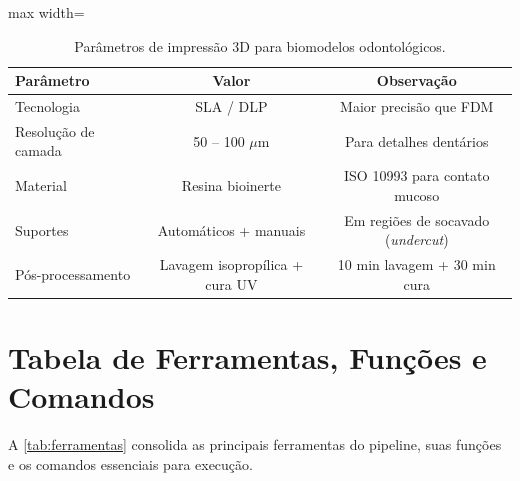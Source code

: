 \begin{table}[htb]
\centering
\caption{Parâmetros de impressão 3D para biomodelos odontológicos.}
\label{tab:impressao3d}
\begin{adjustbox}{max width=\textwidth}
\begin{tabular}{lcc}
\toprule
\textbf{Parâmetro} & \textbf{Valor} & \textbf{Observação} \\
\midrule
Tecnologia & SLA / DLP & Maior precisão que FDM \\
Resolução de camada & 50 -- 100 $\mu$m & Para detalhes dentários \\
Material & Resina bioinerte & ISO 10993 para contato mucoso \\
Suportes & Automáticos + manuais & Em regiões de socavado (\textit{undercut}) \\
Pós-processamento & Lavagem isopropílica + cura UV & 10 min lavagem + 30 min cura \\
\bottomrule
\end{tabular}
\end{adjustbox}
\end{table}

\section{Tabela de Ferramentas, Funções e Comandos}
\label{sec:ferramentas}

A \autoref{tab:ferramentas} consolida as principais ferramentas do
pipeline, suas funções e os comandos essenciais para execução.

